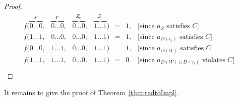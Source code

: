 \documentclass[10pt,a4paper]{article}
\theoremstyle{plain}
\newcommand{\entry}[1]{#1 \dots #1}
\begin{document}
\begin{proof}
\begin{align*}
\begin{matrix}
f( \overbrace{\entry{0}}^{X'},& \overbrace{\entry{0}}^{Y'}, & \overbrace{\entry{0}}^{Z_0}, & \overbrace{\entry{1}}^{Z_1}) & = & 1, & \text{[since $a_Z$ satisfies $C$]} \\
f( \entry{1},& \entry{0}, & \entry{0}, & \entry{1}) & = & 1, & \text{[since $a_{D(v_i)}$ satisfies $C$]} \\
f( \entry{0},& \entry{1}, & \entry{0}, & \entry{1}) & = & 1, & \text{[since $a_{D(W)}$ satisfies $C$]} \\
  \hline
f( \entry{1},& \entry{1}, & \entry{0}, & \entry{1}) & = & 0. & \text{[since $a_{D(W)\cup D(v_i)}$ violates $C$]} \\
\end{matrix}
\end{align*}
%
%
%
\end{proof}
%
It remains to give the proof of Theorem~\ref{thm:redtoImpl}.
\end{document}

